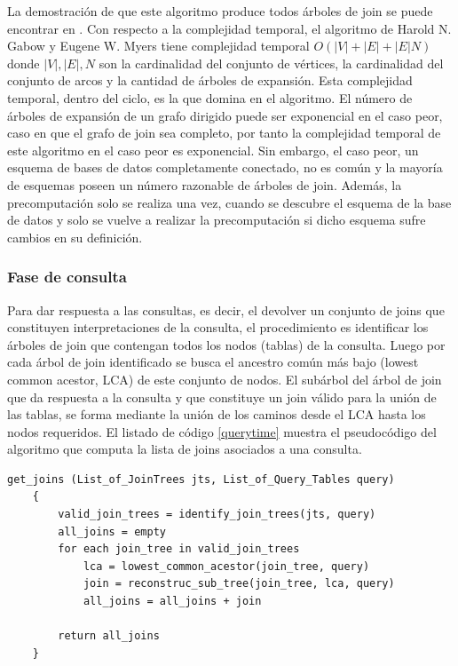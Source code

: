La demostraci\'on de que este algoritmo produce todos \'arboles de join se puede encontrar en 
\cite{mason2005autojoin}. Con respecto a la complejidad temporal, el algoritmo de Harold N. Gabow y 
Eugene W. Myers tiene complejidad temporal $O(|V| + |E| + |E|N)$ donde $|V|, |E|, N$ son la cardinalidad 
del conjunto de v\'ertices, la cardinalidad del conjunto de arcos y la cantidad de \'arboles de expansi\'on. 
Esta complejidad temporal, dentro del ciclo, es la que domina en el algoritmo. El n\'umero de \'arboles de 
expansi\'on de un grafo dirigido puede ser exponencial en el caso peor, caso en que el grafo de join sea 
completo, por tanto la complejidad temporal de este algoritmo en el caso peor es exponencial. Sin embargo, 
el caso peor, un esquema de bases de datos completamente conectado, no es com\'un y la mayor\'ia de esquemas 
poseen un n\'umero razonable de \'arboles de join. Adem\'as, la precomputaci\'on solo se realiza una vez, 
cuando se descubre el esquema de la base de datos y solo se vuelve a realizar la precomputaci\'on si dicho 
esquema sufre cambios en su definición.

\subsubsection{Fase de consulta}

Para dar respuesta a las consultas, es decir, el devolver un conjunto de joins que constituyen 
interpretaciones de la consulta, el procedimiento es identificar los \'arboles de join que 
contengan todos los nodos (tablas) de la consulta. Luego por cada \'arbol de join identificado 
se busca el ancestro com\'un m\'as bajo (lowest common acestor, LCA) de este conjunto de nodos. 
El sub\'arbol del \'arbol de join que da respuesta a la consulta y que constituye un join v\'alido 
para la uni\'on de las tablas, se forma mediante la uni\'on de los caminos desde 
el LCA hasta los nodos requeridos. El listado de c\'odigo \ref{querytime} muestra el pseudoc\'odigo 
del algoritmo que computa la lista de joins asociados a una consulta.

\begin{lstlisting}[label={querytime}, caption={Pseudoc\'odigo del algoritmo de inferencia de joins}]
    get_joins (List_of_JoinTrees jts, List_of_Query_Tables query)
    {
        valid_join_trees = identify_join_trees(jts, query)
        all_joins = empty
        for each join_tree in valid_join_trees
            lca = lowest_common_acestor(join_tree, query)
            join = reconstruc_sub_tree(join_tree, lca, query)
            all_joins = all_joins + join

        return all_joins
    }
\end{lstlisting}

